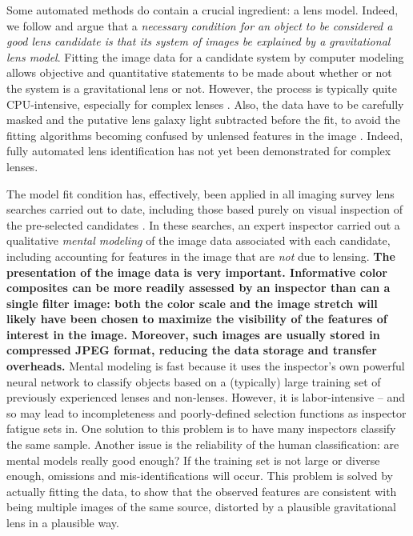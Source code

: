 \documentclass[iop]{emulateapj}
\def\eg{{\it e.g.}\,}
\def\NEW#1{{\bf{#1}}}
\begin{document}
Some automated methods do contain a crucial ingredient: a lens model. Indeed,
we follow \citet{Mar++09} and argue that a {\it necessary condition for an
object to be considered a good lens candidate  is that its system of images be
explained by a gravitational lens model}. Fitting the image data for a
candidate system by  computer modeling allows  objective and quantitative
statements to be made about whether or not the system is a gravitational lens
or not. However, the process is typically quite CPU-intensive, especially for
complex lenses \citep[see e.g.][for the state of the art]{Bre++10}. Also, the
data have to be carefully masked and the putative lens galaxy light subtracted
before the fit, to avoid the fitting algorithms becoming confused by unlensed
features in the image \citep[see \eg][]{Bol++06}.  Indeed, fully automated
lens identification has not yet been demonstrated for complex lenses.

The model fit condition has, effectively, been applied in all imaging survey
lens searches carried out to date,  including those based purely on visual
inspection of the pre-selected candidates \citep[\eg][]{Mou++07,Jac08}. In
these searches, an expert inspector carried out a qualitative  {\it mental
modeling} of the image data associated with each candidate, including
accounting for features in the image that are {\it not} due to lensing.
\NEW{The presentation of the image data is very important. Informative color
composites can be more readily assessed by an inspector than can  a single
filter image: both the color scale and the image stretch will likely have been
chosen to maximize the visibility of the features of interest in the image.
Moreover, such images are usually stored in compressed JPEG  format, reducing
the data storage and transfer overheads.} Mental modeling is fast because it
uses the inspector's  own powerful neural network to classify objects based on
a (typically) large training set of previously experienced lenses and
non-lenses.  However, it is labor-intensive -- and so may lead to
incompleteness and poorly-defined selection functions as inspector fatigue
sets in. One solution to this problem is to have many inspectors classify the
same sample. Another issue is the reliability of the human classification: are
mental models really good enough? If the training set is not large or diverse
enough, omissions and mis-identifications will occur. This problem is solved
by actually fitting the data, to show that the observed features are
consistent with being multiple images of the same source, distorted by a
plausible gravitational  lens in a plausible way.  
\end{document}
